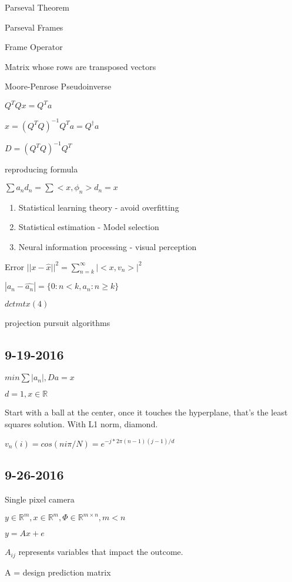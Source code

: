 \documentclass[12pt,letterpaper]{report}
\author{Michael Kummer}
\begin{document}
Parseval Theorem

Parseval Frames

Frame Operator

	Matrix whose rows are transposed vectors

Moore-Penrose Pseudoinverse

	$Q^TQx = Q^Ta$

	$x = (Q^TQ)^{-1}Q^Ta = Q^\dagger a$

$D = (Q^TQ)^{-1}Q^T$

reproducing formula

$\sum a_n d_n = \sum <x, \phi_n>d_n = x$

\begin{enumerate}
\item Statistical learning theory  - avoid overfitting
\item Statistical estimation - Model selection
\item Neural information processing - visual perception
\end{enumerate}

Error $||x - \hat{x}||^2 = \sum^\infty_{n=k}|<x, v_n>|^2$

$|a_n - \hat{a_n}| = \{ 0 : n < k, a_n : n \geq k\}$

$dctmtx(4)$

projection pursuit algorithms


\subsection*{9-19-2016}

$min \sum |a_n|, Da = x$

$d = 1, x \in \mathbb{R}$

Start with a ball at the center, once it touches the hyperplane, that's the least squares solution.  With L1 norm, diamond.

$v_n(i) = cos(ni\pi /N) = e^{-j*2\pi (n-1)(j-1)/d}$

\subsection*{9-26-2016}

Single pixel camera

$y \in \mathbb{R}^m, x \in \mathbb{R}^m, \Phi \in \mathbb{R}^{m \times n}, m < n$

$y = Ax + e$

$A_{ij}$ represents variables that impact the outcome.

A = design prediction matrix
\end{document}
